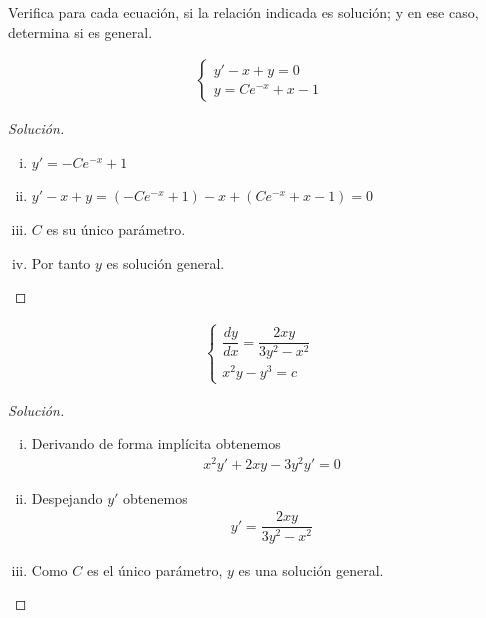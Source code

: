 \begin{resuelto}
	Verifica para cada ecuación, si la relación indicada es solución; y en ese caso, determina si es general.
\end{resuelto}


\begin{align*}
	\begin{cases}
		y'-x+y=0\\
		y = Ce^{-x}+x-1
	\end{cases}
\end{align*}


\begin{proof}[Solución]
	\begin{enumerate}[(i)]
		\item $y'=-Ce^{-x}+1$
		\item $y'-x+y= (-Ce^{-x}+1)-x+(Ce^{-x}+x-1)=0$
		\item $C$ es su único parámetro.
		\item Por tanto $y$ es solución general.
	\end{enumerate}
\end{proof}


\begin{align*}
	\begin{cases}
		\dfrac{dy}{dx}=\dfrac{2xy}{3y^{2}-x^{2}}\\
		x^{2}y-y^{3}=c
	\end{cases}
\end{align*}


\begin{proof}[Solución]
	\begin{enumerate}[(i)]
		\item Derivando de forma implícita obtenemos
		\begin{align*}
			x^{2}y'+2xy-3y^{2}y'=0
		\end{align*}
		\item Despejando $y'$ obtenemos
		\begin{align*}
			y'=\dfrac{2xy}{3y^{2}-x^{2}}
		\end{align*}
		\item Como $C$ es el único parámetro, $y$ es una solución general.
	\end{enumerate}
\end{proof}


